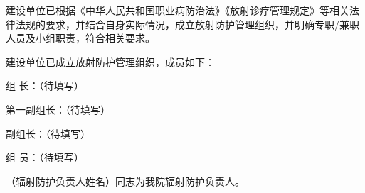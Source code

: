 建设单位已根据《中华人民共和国职业病防治法》《放射诊疗管理规定》等相关法律法规的要求，并结合自身实际情况，成立放射防护管理组织，并明确专职/兼职人员及小组职责，符合相关要求。

建设单位已成立放射防护管理组织，成员如下：

组 长：（待填写）

第一副组长：（待填写）

副组长：（待填写）

组 员：（待填写）

（辐射防护负责人姓名）同志为我院辐射防护负责人。
